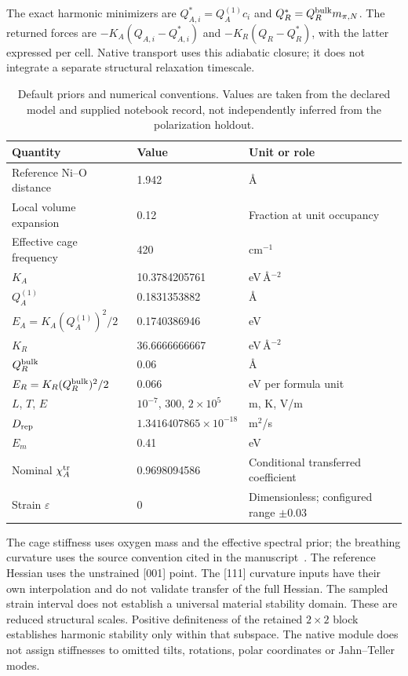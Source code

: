 \documentclass[11pt,a4paper]{article}
\begin{document}
The exact harmonic minimizers are $Q_{A,i}^*=Q_A^{(1)}c_i$ and $Q_R^*=Q_R^{\rm bulk}m_{\pi,N}$. The returned forces are $-K_A(Q_{A,i}-Q_{A,i}^*)$ and $-K_R(Q_R-Q_R^*)$, with the latter expressed per cell. Native transport uses this adiabatic closure; it does not integrate a separate structural relaxation timescale.

\begin{table}[htbp]
\centering\small
\caption{Default priors and numerical conventions. Values are taken from the declared model and supplied notebook record, not independently inferred from the polarization holdout.}\label{tab:parameters}
\begin{tabular}{@{}lll@{}}\toprule
Quantity & Value & Unit or role\\\midrule
Reference Ni--O distance & 1.942 & \AA\\
Local volume expansion & 0.12 & Fraction at unit occupancy\\
Effective cage frequency & 420 & cm$^{-1}$\\
$K_A$ & 10.3784205761 & eV\,\AA$^{-2}$\\
$Q_A^{(1)}$ & 0.1831353882 & \AA\\
$E_A=K_A(Q_A^{(1)})^2/2$ & 0.1740386946 & eV\\
$K_R$ & 36.6666666667 & eV\,\AA$^{-2}$\\
$Q_R^{\rm bulk}$ & 0.06 & \AA\\
$E_R=K_R(Q_R^{\rm bulk})^2/2$ & 0.066 & eV per formula unit\\
$L$, $T$, $E$ & $10^{-7}$, 300, $2\times10^5$ & m, K, V/m\\
$D_{\rm rep}$ & $1.3416407865\times10^{-18}$ & m$^2$/s\\
$E_m$ & 0.41 & eV\\
Nominal $\chi_A^{\rm tr}$ & 0.9698094586 & Conditional transferred coefficient\\
Strain $\varepsilon$ & 0 & Dimensionless; configured range $\pm0.03$\\
\bottomrule\end{tabular}
\end{table}

The cage stiffness uses oxygen mass and the effective spectral prior; the breathing curvature uses the source convention cited in the manuscript~\cite{lione}. The reference Hessian uses the unstrained [001] point. The [111] curvature inputs have their own interpolation and do not validate transfer of the full Hessian. The sampled strain interval does not establish a universal material stability domain. These are reduced structural scales. Positive definiteness of the retained $2\times2$ block establishes harmonic stability only within that subspace. The native module does not assign stiffnesses to omitted tilts, rotations, polar coordinates or Jahn--Teller modes.
\end{document}
